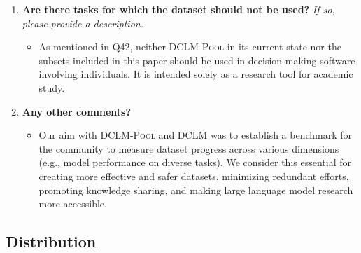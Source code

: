 \documentclass{article}
\newcommand{\dclm}{\textsc{DCLM}\xspace}
\newcommand{\rawpool}{\textsc{DCLM-Pool}\xspace}
\begin{document}
\begin{enumerate}[label=Q\arabic*, resume]
\begin{itemize}
\item \rawpool and its related datasets and models are not designed for use in production systems, particularly those involving sensitive areas such as race, gender identity or expression, ethnicity, sexual orientation, age, socioeconomic status, disability, religion, national origin, or creed. \rawpool is unsuitable for applications that involve decision-making about individuals. Since \rawpool is sourced from the internet, it inherently contains biases, unfairness, and stereotypes prevalent in society. It is intended solely as a research tool to examine language-modeling dataset curation on a large scale and to study the impact of various data curation methods on downstream models.
\end{itemize}

\item \textbf{Are there tasks for which the dataset should not be used?} \textit{If so, please provide a description.}

\begin{itemize}
\item As mentioned in Q42, neither \rawpool in its current state nor the subsets included in this paper should be used in decision-making software involving individuals. It is intended solely as a research tool for academic study.
\end{itemize}

\item \textbf{Any other comments?}

\begin{itemize}
\item Our aim with \rawpool and \dclm was to establish a benchmark for the community to measure dataset progress across various dimensions (e.g., model performance on diverse tasks). We consider this essential for creating more effective and safer datasets, minimizing redundant efforts, promoting knowledge sharing, and making large language model research more accessible.
\end{itemize}

\end{enumerate}

\subsection{Distribution}
\end{document}
